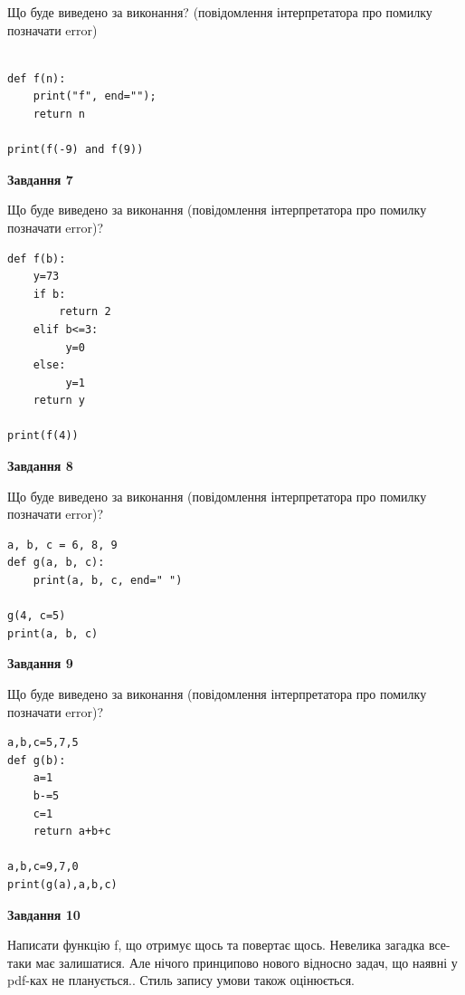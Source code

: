 \documentclass[12pt, ukrainian]{article}
\begin{document}
{\begin {large}
Що буде виведено за виконання? (повідомлення інтерпретатора про помилку позначати error)\par
\begin{verbatim}

def f(n):
    print("f", end="");
    return n

print(f(-9) and f(9))
\end{verbatim}

{\begin {center}\textbf{Завдання 7}\end {center}}

Що буде виведено за виконання (повідомлення інтерпретатора про помилку позначати error)?\par
\begin{verbatim}
def f(b):
    y=73
    if b: 
        return 2
    elif b<=3:
         y=0
    else:
         y=1
    return y

print(f(4))
\end{verbatim}

{\begin {center}\textbf{Завдання 8}\end {center}}

Що буде виведено за виконання (повідомлення інтерпретатора про помилку позначати error)?\par
\begin{verbatim}
a, b, c = 6, 8, 9
def g(a, b, c):
    print(a, b, c, end=" ")

g(4, c=5)
print(a, b, c)
\end{verbatim}

{\begin {center}\textbf{Завдання 9}\end {center}}

Що буде виведено за виконання (повідомлення інтерпретатора про помилку позначати error)?\par
\begin{verbatim}
a,b,c=5,7,5
def g(b):
    a=1
    b-=5
    c=1
    return a+b+c

a,b,c=9,7,0
print(g(a),a,b,c)
\end{verbatim}

{\begin {center}\textbf{Завдання 10}\end {center}}


Написати функцiю f, що отримує щось та повертає щось. Невелика загадка все-таки має залишатися. Але нічого принципово нового відносно задач, що наявні у pdf-ках не планується.. Стиль запису умови також оцінюється.\par
\end {large}}
\newpage
\end{document}
